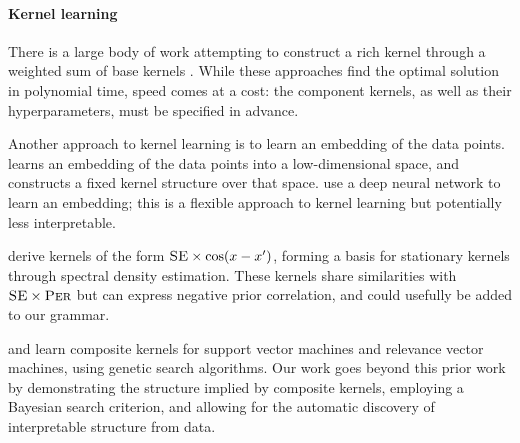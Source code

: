 \documentclass[twoside]{article}
\begin{document}
\paragraph{Kernel learning}
There is a large body of work attempting to construct a rich kernel through a weighted sum of base kernels \citep[e.g.][]{christoudias2009bayesian, Bach_HKL}.
While these approaches find the optimal solution in polynomial time, speed comes at a cost: the component kernels, as well as their hyperparameters, must be specified in advance.

Another approach to kernel learning is to learn an embedding of the data points. 
\citet{lawrence2005probabilistic} learns an embedding of the data points into a low-dimensional space, and constructs a fixed kernel structure over that space.
\citet{salakhutdinov2008using} use a deep neural network to learn an embedding; this is a flexible approach to kernel learning but potentially less interpretable.

\citet{WilAda13} derive kernels of the form ${\textsc{SE} \times \cos(x-x')}$, forming a basis for stationary kernels through spectral density estimation.
These kernels share similarities with ${{\textsc{SE}} \times {\textsc{Per}}}$ but can express negative prior correlation, and could usefully be added to our grammar.

\citet{diosan2007evolving} and \citet{bing2010gp} learn composite kernels for support vector machines and relevance vector machines, using genetic search algorithms.
Our work goes beyond this prior work by demonstrating the structure implied by composite kernels, employing a Bayesian search criterion, and allowing for the automatic discovery of interpretable structure from data.
\end{document}

